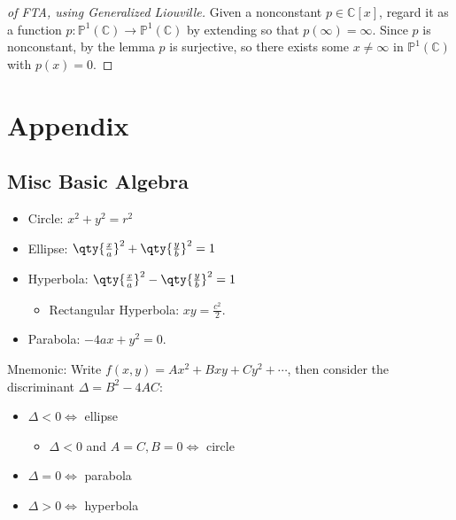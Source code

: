 \begin{proof}[of FTA, using Generalized Liouville]

Given a nonconstant \(p\in {\mathbb{C}}[x]\), regard it as a function
\(p: {\mathbb{P}}^1({\mathbb{C}}) \to {\mathbb{P}}^1({\mathbb{C}})\) by
extending so that \(p(\infty) = \infty\). Since \(p\) is nonconstant, by
the lemma \(p\) is surjective, so there exists some \(x\neq \infty\) in
\({\mathbb{P}}^1({\mathbb{C}})\) with \(p(x) = 0\).

\end{proof}

\hypertarget{appendix}{%
\section{Appendix}\label{appendix}}

\hypertarget{misc-basic-algebra}{%
\subsection{Misc Basic Algebra}\label{misc-basic-algebra}}

\begin{fact}

\envlist

\begin{itemize}
\tightlist
\item
  Circle: \(x^2 + y^2 = r^2\)
\item
  Ellipse: \(\qty{\frac x a}^2 + \qty{\frac y b}^2 = 1\)
\item
  Hyperbola: \(\qty{\frac x a}^2 - \qty{\frac y b}^2 = 1\)

  \begin{itemize}
  \tightlist
  \item
    Rectangular Hyperbola: \(xy = \frac{c^2}{2}\).
  \end{itemize}
\item
  Parabola: \(-4ax + y^2 = 0\).
\end{itemize}

Mnemonic: Write \(f(x, y) = Ax^2 + Bxy + Cy^2 + \cdots\), then consider
the discriminant \(\Delta = B^2 - 4AC\):

\begin{itemize}
\tightlist
\item
  \(\Delta < 0 \iff\) ellipse

  \begin{itemize}
  \tightlist
  \item
    \(\Delta < 0\) and \(A=C, B=0 \iff\) circle
  \end{itemize}
\item
  \(\Delta = 0 \iff\) parabola
\item
  \(\Delta > 0 \iff\) hyperbola
\end{itemize}

\end{fact}

